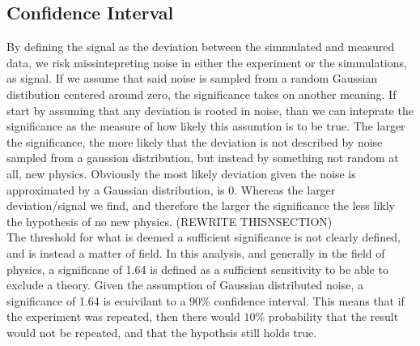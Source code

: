 \subsection{Confidence Interval}
By defining the signal as the deviation between the simmulated and measured data, we risk missintepreting noise in either the 
experiment or the simmulations, as signal. If we assume that said noise is sampled from a random Gaussian distibution centered around 
zero, the significance takes on another meaning. If start by assuming that any deviation is rooted in noise, than we can inteprate the significance
as the measure of how likely this assumtion is to be true. The larger the significance, the more likely that the deviation is not described 
by noise sampled from a gaussion distribution, but instead by something not random at all, new physics. Obviously the most likely deviation 
given the noise is approximated by a Gaussian distribution, is 0. Whereas the larger deviation/signal we find, and therefore the larger the significance 
the less likly the hypothesis of no new physics. 
(REWRITE THISNSECTION)
\\
The threshold for what is deemed a sufficient significance is not clearly defined, and is instead a matter of field. In this analysis, and generally 
in the field of physics, a significane of 1.64 is defined as a sufficient sensitivity to be able to exclude a theory. Given the assumption of Gaussian
distributed noise, a significance of 1.64 is ecuivilant to a $90\%$ confidence interval. This means that if the experiment was repeated, then there would 
$10\%$ probability that the result would not be repeated, and that the hypothsis still holds true.

